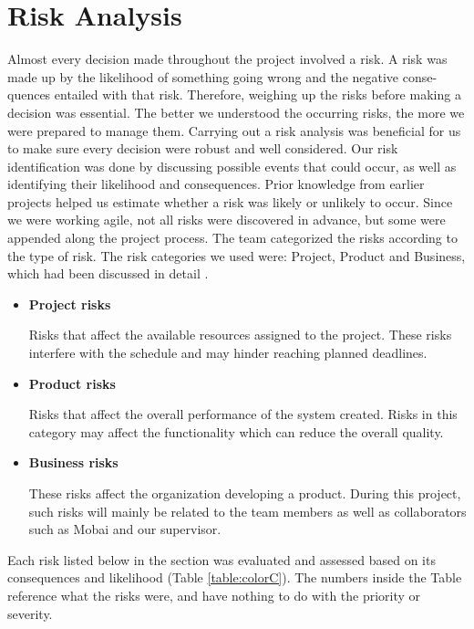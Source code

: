 \section{Risk Analysis} 
\label{sec:riskanalysis}
Almost every decision made throughout the project involved a risk. A risk was made up by the likelihood of something going wrong and the negative conse-quences entailed with that risk. Therefore, weighing up the risks before making a decision was essential. The better we understood the occurring risks, the more we were prepared to manage them. Carrying out a risk analysis was beneficial for us to make sure every decision were robust and well considered. Our risk identification was done by discussing possible events that could occur, as well as identifying their likelihood and consequences. Prior knowledge from earlier projects helped us estimate whether a risk was likely or unlikely to occur. Since we were working agile, not all risks were discovered in advance, but some were appended along the project process. The team categorized the risks according to the type of risk. The risk categories we used were: Project, Product and Business, which had been discussed in detail \cite{RiskAnalysis}. 

\begin{itemize}
    \item \textbf{Project risks} 
        \par \hspace{0,5cm} Risks that affect the available resources assigned to the project. These risks interfere with the schedule and may hinder reaching planned deadlines. 
    \item \textbf{Product risks} 
        \par \hspace{0,5cm} Risks that affect the overall performance of the system created. Risks in this category may affect the functionality which can reduce the overall quality. 
    \item \textbf{Business risks}
        \par \hspace{0,5cm} These risks affect the organization developing a product. During this project, such risks will mainly be related to the team members as well as collaborators such as Mobai and our supervisor. 
\end{itemize}

Each risk listed below in the section was evaluated and assessed based on its consequences and likelihood (Table \ref{table:colorC}). The numbers inside the Table reference what the risks were, and have nothing to do with the priority or severity. 
    
